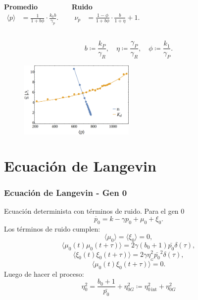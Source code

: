 \documentclass[xcolor=dvipsnames]{beamer}
\begin{document}
\begin{frame}
\begin{columns}[c]

\centering \textbf{Promedio}
\begin{align*}
\langle p \rangle &= \frac{1}{1+b\phi} \cdot \frac{k_0b}{\gamma_p}.
\end{align*}

\centering \textbf{Ruido}
\begin{align*}
\nu_p &= \frac{1-\phi}{1+b\phi} \cdot \frac{b}{1+\eta}+1.
\end{align*}
\end{columns}

\vspace{3 mm}

\begin{equation*}
  b \coloneqq \frac{k_P}{\gamma_R}, \quad \eta \coloneqq \frac{\gamma_P}{\gamma_R}, \quad \phi \coloneqq \frac{k_1}{\gamma_P}.
\end{equation*}

\begin{figure}[p]
    \centering
    \includegraphics[width=0.5\textwidth]{mas-sim_autorreg.png}\\
\end{figure}


\end{frame}

\section{Ecuaci\'on de Langevin}

\begin{frame}
  \frametitle{Ecuaci\'on de Langevin - Gen 0}
Ecuaci\'on determinista con t\'erminos de ruido. Para el gen 0
$$\dot{p_0} = k - \gamma p_0 + \mu_0 + \xi_{0}.$$
Los t\'erminos de ruido cumplen:
$$\langle \mu_0 \rangle = \langle \xi_0 \rangle = 0,$$
$$\langle \mu_0(t)\mu_0(t+\tau) \rangle  = 2\gamma (b_0+1) \bar{p_0} \delta(\tau),$$
$$\langle \xi_0(t)\xi_0(t+\tau) \rangle = 2 \gamma \eta_{_G}^2\bar{p_0}^2 \delta(\tau),$$
$$\langle \mu_0(t)\xi_0(t+\tau) \rangle = 0.$$
Luego de hacer el proceso:
$$\eta_0^2=\frac{b_0+1}{\bar{p_0}} + \eta_{0G}^2\coloneqq\eta_{0\,\text{int}}^2+\eta_{0G}^2$$
\end{frame}
\end{document}
